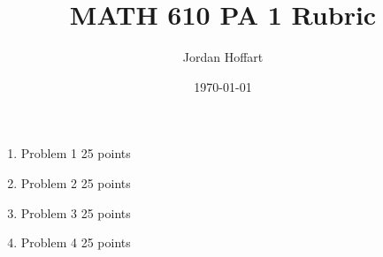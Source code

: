 \documentclass{article}
\title{MATH 610 PA 1 Rubric}
\author{Jordan Hoffart}
\date{\today}
\begin{document}
\maketitle

\begin{enumerate}
	\item Problem 1 25 points
	\item Problem 2 25 points
	\item Problem 3 25 points
	\item Problem 4 25 points
\end{enumerate}
\end{document}
